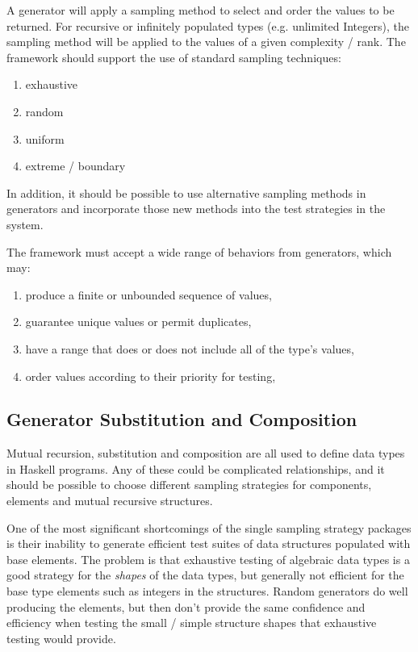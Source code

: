 A generator will apply a sampling method to select and order the values to be returned.
For recursive or infinitely populated types (e.g. unlimited Integers),
the sampling method will be applied to the values of a given complexity / rank.
The framework should support the use of standard sampling techniques:
\begin{enumerate}
    \item exhaustive
    \item random
    \item uniform
    \item extreme / boundary
\end{enumerate}
In addition, it should be possible to use alternative sampling methods in generators
and incorporate those new methods into the test strategies in the system.

The framework must accept a wide range of behaviors from generators, which may:
\begin{enumerate}
    \item produce a finite or unbounded sequence of values,
    \item guarantee unique values or permit duplicates,
    \item have a range that does or does not include all of the type's values,
    \item order values according to their priority for testing,
\end{enumerate}


\subsection{ Generator Substitution and Composition } \label{sub:reqsubcomp}


Mutual recursion, substitution and composition are all used
to define data types in Haskell programs.
Any of these could be complicated relationships,
and it should be possible to choose different sampling strategies
for components, elements and mutual recursive structures.

One of the most significant shortcomings of the single sampling strategy packages
is their inability to generate efficient test suites of data structures populated with base elements.
The problem is that exhaustive testing of algebraic data types 
is a good strategy for the \emph{shapes} of the data types,
but generally not efficient for the base type elements such as integers in the structures.
Random generators do well producing the elements,
but then don't provide the same confidence and efficiency when testing
the small / simple structure shapes that exhaustive testing would provide.

